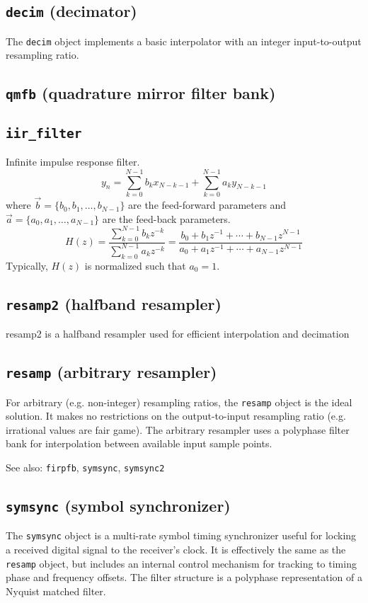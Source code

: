 \subsection{{\tt decim} (decimator)}
The {\tt decim} object implements a basic interpolator with an integer
input-to-output resampling ratio.

\subsection{{\tt qmfb} (quadrature mirror filter bank)}

\subsection{{\tt iir\_filter}}
Infinite impulse response filter.
\[
    y_n = \sum_{k=0}^{N-1}{ b_k x_{N-k-1} } +
          \sum_{k=0}^{N-1}{ a_k y_{N-k-1} }
\]
where $\vec{b} = \{b_0,b_1,\ldots,b_{N-1}\}$ are the feed-forward parameters
and $\vec{a} = \{a_0,a_1,\ldots,a_{N-1}\}$ are the feed-back parameters.
\[
    H(z) = \frac{\sum_{k=0}^{N-1}{b_k z^{-k}}}
                {\sum_{k=0}^{N-1}{a_k z^{-k}}}
         = \frac{ b_0 + b_1 z^{-1} + \cdots + b_{N-1} z^{N-1}}
                { a_0 + a_1 z^{-1} + \cdots + a_{N-1} z^{N-1}}
\]
Typically, $H(z)$ is normalized such that $a_0=1$.

\subsection{{\tt resamp2} (halfband resampler)}
resamp2 is a halfband resampler used for efficient interpolation and
decimation

\subsection{{\tt resamp} (arbitrary resampler)}
For arbitrary (e.g. non-integer) resampling ratios, the {\tt resamp} object is
the ideal solution.
It makes no restrictions on the output-to-input resampling ratio (e.g.
irrational values are fair game).
The arbitrary resampler uses a polyphase filter bank for interpolation between
available input sample points.

See also: {\tt firpfb}, {\tt symsync}, {\tt symsync2}

\subsection{{\tt symsync} (symbol synchronizer)}
The {\tt symsync} object is a multi-rate symbol timing synchronizer useful for
locking a received digital signal to the receiver's clock.
It is effectively the same as the {\tt resamp} object, but includes an
internal control mechanism for tracking to timing phase and frequency offsets.
The filter structure is a polyphase representation of a Nyquist matched
filter.

